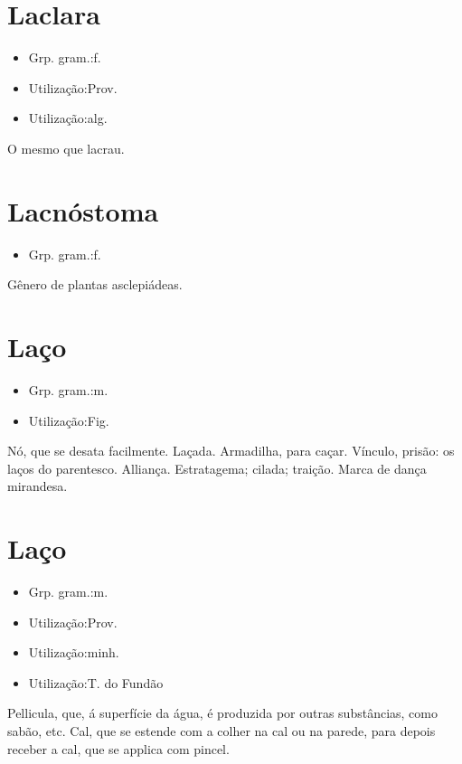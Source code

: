 \section{Laclara}
\begin{itemize}
\item {Grp. gram.:f.}
\end{itemize}
\begin{itemize}
\item {Utilização:Prov.}
\end{itemize}
\begin{itemize}
\item {Utilização:alg.}
\end{itemize}
O mesmo que \textunderscore lacrau\textunderscore .
\section{Lacnóstoma}
\begin{itemize}
\item {Grp. gram.:f.}
\end{itemize}
Gênero de plantas asclepiádeas.
\section{Laço}
\begin{itemize}
\item {Grp. gram.:m.}
\end{itemize}
\begin{itemize}
\item {Utilização:Fig.}
\end{itemize}
Nó, que se desata facilmente.
Laçada.
Armadilha, para caçar.
Vínculo, prisão: \textunderscore os laços do parentesco\textunderscore .
Alliança.
Estratagema; cilada; traição.
Marca de dança mirandesa.
\section{Laço}
\begin{itemize}
\item {Grp. gram.:m.}
\end{itemize}
\begin{itemize}
\item {Utilização:Prov.}
\end{itemize}
\begin{itemize}
\item {Utilização:minh.}
\end{itemize}
\begin{itemize}
\item {Utilização:T. do Fundão}
\end{itemize}
Pellicula, que, á superfície da água, é produzida por outras substâncias, como sabão, etc.
Cal, que se estende com a colher na cal ou na parede, para depois receber a cal, que se applica com pincel.
